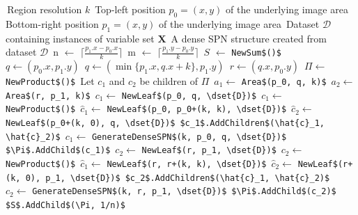 \documentclass{amsart}
\theoremstyle{plain}
\numberwithin{equation}{section}
\newcommand{\mcode}[1]{\lstinline[mathescape]!#1!}
\newcommand{\dset}[1]{\mathcal{#1}}
\begin{document}
\begin{algorithm}[H]
  \caption{\mcode{GenerateDenseSPN$(k, p_0, p_1, \dset{D})$}}\label{alg:structure}
  \begin{algorithmic}[1]
    \Require\,Region resolution $k$
    \Require\,Top-left position $p_0= (x,y)$ of the underlying image area
    \Require\,Bottom-right position $p_1= (x,y)$ of the underlying image area
    \Require\,Dataset $\dset{D}$ containing instances of variable set $\mathbf{X}$
    \Ensure\,A dense SPN structure created from dataset $\dset{D}$
    \State\,n $\gets$ $\lceil\frac{p_1.x-p_0.x}{k}\rceil$
    \State\,m $\gets$ $\lceil\frac{p_1.y-p_0.y}{k}\rceil$
    \State\,$S$ $\gets$ \mcode{NewSum$()$}
    \State\,$q \gets (p_0.x, p_1.y)$
        \State\,$q \gets (\min\{p_1.x, q.x + k\}, p_1.y)$
        \State\,$r \gets (q.x, p_0.y)$
        \State\,$\Pi \gets$ \mcode{NewProduct$()$}
        \State\,Let $c_1$ and $c_2$ be children of $\Pi$
        \State\,$a_1 \gets$ \mcode{Area$(p_0, q, k)$}
        \State\,$a_2 \gets$ \mcode{Area$(r, p_1, k)$}
          \State\,$c_1 \gets$ \mcode{NewLeaf$(p_0, q, \dset{D})$}
          \State\,$c_1 \gets$ \mcode{NewProduct$()$}
          \State\,$\hat{c}_1 \gets$ \mcode{NewLeaf$(p_0, p_0+(k, k), \dset{D})$}
          \State\,$\hat{c}_2 \gets$ \mcode{NewLeaf$(p_0+(k, 0), q, \dset{D})$}
          \State\,\mcode{$c_1$.AddChildren$(\hat{c}_1, \hat{c}_2)$}
        \Else%
          \State\,$c_1 \gets$ \mcode{GenerateDenseSPN$(k, p_0, q, \dset{D})$}
        \EndIf%
        \State\,\mcode{$\Pi$.AddChild$(c_1)$}
          \State\,$c_2 \gets$ \mcode{NewLeaf$(r, p_1, \dset{D})$}
          \State\,$c_2 \gets$ \mcode{NewProduct$()$}
          \State\,$\hat{c}_1 \gets$ \mcode{NewLeaf$(r, r+(k, k), \dset{D})$}
          \State\,$\hat{c}_2 \gets$ \mcode{NewLeaf$(r+(k, 0), p_1, \dset{D})$}
          \State\,\mcode{$c_2$.AddChildren$(\hat{c}_1, \hat{c}_2)$}
        \Else%
          \State\,$c_2 \gets$ \mcode{GenerateDenseSPN$(k, r, p_1, \dset{D})$}
        \EndIf%
        \State\,\mcode{$\Pi$.AddChild$(c_2)$}
        \State\,\mcode{$S$.AddChild$(\Pi, 1/n)$}
      \EndFor%
    \EndIf%
  \end{algorithmic}
\end{algorithm}
\end{document}
